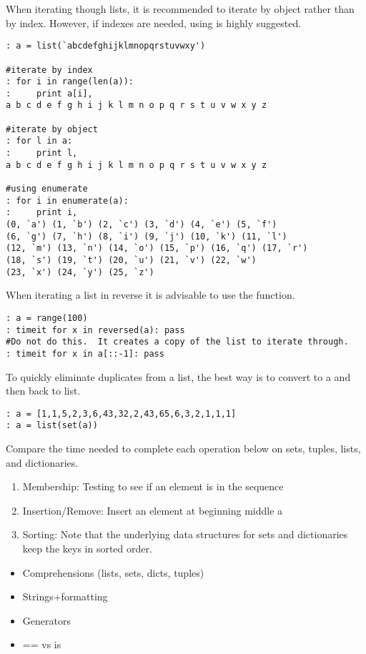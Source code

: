 When iterating though lists, it is recommended to iterate by object rather than by index.
However, if indexes are needed, using  is highly suggested.
\begin{lstlisting}
: a = list(`abcdefghijklmnopqrstuvwxy')

#iterate by index
: for i in range(len(a)):
:     print a[i],
a b c d e f g h i j k l m n o p q r s t u v w x y z

#iterate by object
: for l in a:
:     print l,
a b c d e f g h i j k l m n o p q r s t u v w x y z

#using enumerate
: for i in enumerate(a):
:     print i,
(0, `a') (1, `b') (2, `c') (3, `d') (4, `e') (5, `f') 
(6, `g') (7, `h') (8, `i') (9, `j') (10, `k') (11, `l') 
(12, `m') (13, `n') (14, `o') (15, `p') (16, `q') (17, `r') 
(18, `s') (19, `t') (20, `u') (21, `v') (22, `w') 
(23, `x') (24, `y') (25, `z')
\end{lstlisting}

When iterating a list in reverse it is advisable to use the  function.
\begin{lstlisting}
: a = range(100)
: timeit for x in reversed(a): pass
#Do not do this.  It creates a copy of the list to iterate through.
: timeit for x in a[::-1]: pass
\end{lstlisting}

To quickly eliminate duplicates from a list, the best way is to convert to a 
and then back to list.
\begin{lstlisting}
: a = [1,1,5,2,3,6,43,32,2,43,65,6,3,2,1,1,1]
: a = list(set(a))
\end{lstlisting}

\begin{problem}
Compare the time needed to complete each operation below on sets, tuples, lists, and dictionaries.
\begin{enumerate}
\item Membership: Testing to see if an element is in the sequence
\item Insertion/Remove: Insert an element at beginning middle a
\item Sorting: Note that the underlying data structures for sets and dictionaries keep the keys in sorted order.
\end{enumerate}

\end{problem}



\begin{itemize}
\item Comprehensions (lists, sets, dicts, tuples)
\item Strings+formatting
\item Generators
\item == vs is
\end{itemize}